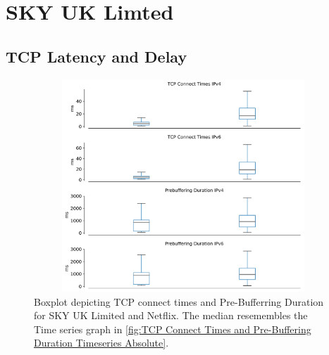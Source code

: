 \section{SKY UK Limted}

\subsection*{TCP Latency and Delay}

\begin{figure}[!ht]
	\centering
	\includegraphics[keepaspectratio, height=8cm, width=15cm]{figures/cache/bskyb/netflix-tcp-prebuffering-delay-boxplot-bskyb-seprate.pdf}
	\caption[SKY UK TCP Connect Times and Pre-Buffering Duration Boxplot Absolute]{Boxplot depicting TCP connect times and Pre-Bufferring Duration for SKY UK Limited and Netflix. The median resemembles the Time series graph in \cref{fig:TCP Connect Times and Pre-Buffering Duration Timeseries Absolute}.}
	\label{fig: SKY UK TCP Connect Times and Pre-Buffering Duration Boxplot Absolute}
\end{figure}

